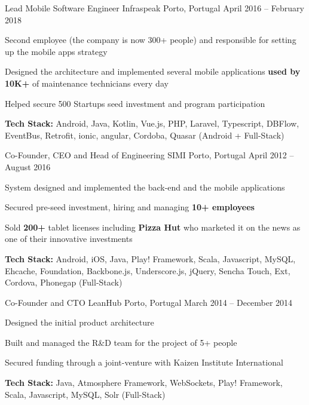 \documentclass[]{awesome-cv}
\begin{document}
\begin{cventries}
	\vspace{-4mm}
	\cventry
	{Lead Mobile Software Engineer}
	{Infraspeak}
	{Porto, Portugal}
	{April 2016 – February 2018}
	{\begin{cvitems}
		\item {Second employee (the company is now 300+ people) and responsible for setting up the mobile apps strategy}
		\item {Designed the architecture and implemented several mobile applications \textbf{used by 10K+} of maintenance technicians every day}
		\item {Helped secure 500 Startups seed investment and program participation}
		\item {\textbf{Tech Stack:} Android, Java, Kotlin, Vue.js, PHP, Laravel, Typescript, DBFlow, EventBus, Retrofit, ionic, angular, Cordoba, Quasar (Android + Full-Stack)}
		\end{cvitems}}

	\vspace{-4mm}
	\cventry
	{Co-Founder, CEO and Head of Engineering}
	{SIMI}
	{Porto, Portugal}
	{April 2012 – August 2016}
	{\begin{cvitems}
		\item {System designed and implemented the back-end and the mobile applications}
		\item {Secured pre-seed investment, hiring and managing \textbf{10+ employees}}
		\item {Sold \textbf{200+} tablet licenses including \textbf{Pizza Hut} who marketed it on the news as one of their innovative investments}
		\item {\textbf{Tech Stack:} Android, iOS, Java, Play! Framework, Scala, Javascript, MySQL, Ehcache, Foundation, Backbone.js, Underscore.js, jQuery, Sencha Touch, Ext, Cordova, Phonegap (Full-Stack)}
		\end{cvitems}}

	\vspace{-4mm}
	\cventry
	{Co-Founder and CTO}
	{LeanHub}
	{Porto, Portugal}
	{March 2014 – December 2014}
	{\begin{cvitems}
		\item {Designed the initial product architecture}
		\item {Built and managed the R\&D team for the project of 5+ people}
		\item {Secured funding through a joint-venture with Kaizen Institute International}
		\item {\textbf{Tech Stack:} Java, Atmosphere Framework, WebSockets, Play! Framework, Scala, Javascript, MySQL, Solr (Full-Stack)}
		\end{cvitems}}


\end{cventries}
\end{document}
